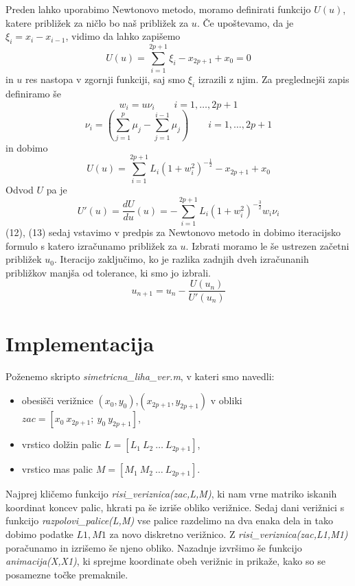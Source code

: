 \documentclass[A4paper, 11pt]{article}
\begin{document}
Preden lahko uporabimo Newtonovo metodo, moramo definirati funkcijo $U(u)$, katere približek za ničlo bo naš približek za $u$.
Če upoštevamo, da je $\xi_i = x_i - x_{i-1}$, vidimo da lahko zapišemo
\[ U(u) = \sum_{i=1}^{2p+1} \xi_i - x_{2p+1} + x_0 = 0 \]
in $u$ res nastopa v zgornji funkciji, saj smo $\xi_i$ izrazili z njim. Za preglednejši zapis definiramo še 
\begin{equation}
w_i = u \nu_i \qquad i=1, \ldots, 2p+1
\end{equation}
\begin{equation}
\nu_i = \left ( \sum_{j=1}^{p} \mu_j - \sum_{j=1}^{i-1} \mu_j \right ) \qquad i=1, \ldots, 2p+1
\end{equation}
in dobimo
\begin{equation}
U(u) =  \sum_{i=1}^{2p+1} L_i (1 + w_i ^2) ^ {-\frac{1}{2}} - x_{2p+1} + x_0
\end{equation}
Odvod $U$ pa je
\begin{equation}
U'(u) = \frac{dU}{du} (u) = - \sum_{i=1}^{2p+1} L_i (1 + w_i ^2) ^ {-\frac{3}{2}} w_i \nu_i 
\end{equation}
(12), (13) sedaj vstavimo v predpis za Newtonovo metodo in dobimo iteracijsko formulo s katero izračunamo približek za $u$. Izbrati moramo le še ustrezen začetni približek $u_0$. Iteracijo zaključimo, ko je razlika zadnjih dveh izračunanih približkov manjša od tolerance, ki smo jo izbrali.
\[ u_{n+1} = u_n - \frac{U(u_n)}{U'(u_n)} \]


\section{Implementacija}

Poženemo skripto \textit{simetricna\_liha\_ver.m}, v kateri smo navedli:
\begin{itemize}
\item obesišči verižnice $(x_0,y_0)$,$(x_{2p+1},y_{2p+1})$ v obliki $zac = [x_0 \  x_{2p+1};\  y_0 \  y_{2p+1}]$, 
\item vrstico dolžin palic $L = [L_1 \  L_2 \ \ldots \ L_{2p+1}]$,
\item vrstico mas palic $M = [M_1 \ M_2 \ \ldots \ L_{2p+1}]$.
\end{itemize}
Najprej kličemo funkcijo \textit{risi\_veriznica(zac,L,M)}, ki nam vrne matriko iskanih koordinat koncev palic, hkrati pa še izriše obliko verižnice. Sedaj dani verižnici s funkcijo \textit{razpolovi\_palice(L,M)} vse palice razdelimo na dva enaka dela in tako dobimo podatke $L1, M1$ za novo diskretno verižnico. Z \textit{risi\_veriznica(zac,L1,M1)} poračunamo in izrišemo še njeno obliko. Nazadnje izvršimo še funkcijo \textit{animacija(X,X1)}, ki sprejme koordinate obeh verižnic in prikaže, kako so se posamezne točke premaknile.
\end{document}

